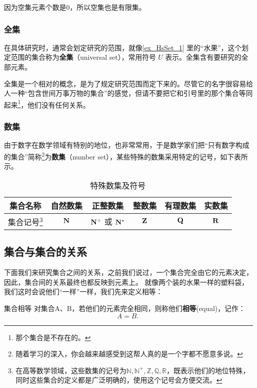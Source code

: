 因为空集元素个数是0，所以空集也是有限集。

\subsubsection{全集}

在具体研究时，通常会划定研究的范围，就像\autoref{ex_HsSet_1} 里的“水果”，这个划定范围的集合称为\textbf{全集}（universal set），常用符号 $U$ 表示。全集含有要研究的全部元素。

全集是一个相对的概念，是为了规定研究范围而定下来的。尽管它的名字很容易给人一种“包含世间万事万物的集合”的感觉，但请不要把它和引号里的那个集合等同起来\footnote{那个集合是不存在的。}，他们没有任何关系。

\subsubsection{数集}

由于数字在数学领域有特别的地位，也非常常用，于是数学家们把“只有数字构成的集合”简称\footnote{随着学习的深入，你会越来越感受到这帮人真的是一个字都不愿意多说。}为\textbf{数集}（number set），某些特殊的数集采用特定的记号，如下表所示。

\begin{table}[ht]
\centering
\caption{特殊数集及符号}\label{tab_HsSet2}
\begin{tabular}{|c|c|c|c|c|c|}
\hline
集合名称 &自然数集  &正整数集  & 整数集 & 有理数集& 实数集 \\
\hline
集合记号\footnote{在高等数学领域，这些数集的记号为$\mathbb{N,N^+,Z,Q,R}$，既表示他们的地位特殊，同时这些集合的定义都是广泛明确的，使用这个记号会方便交流。} & ${\rm \mathbf{N}}$ & ${\rm \mathbf{N^+}}$ 或 ${\rm \mathbf{N^*}}$ & ${\rm \mathbf{Z}}$ & ${\rm \mathbf{Q}}$ & ${\rm \mathbf{R}}$ \\
\hline
\end{tabular}
\end{table}


\subsection{集合与集合的关系}\label{sub_HsSet_1}
下面我们来研究集合之间的关系，之前我们说过，一个集合完全由它的元素决定，因此，集合间的关系最终也都反映到元素上。
就像两个装的水果一样的塑料袋，我们这时会说他们“一样”一样，我们先来定义相等：
\begin{definition}{集合相等}
对集合A、B，若他们的元素完全相同，则称他们\textbf{相等}(equal)，记作：
\begin{equation}
A=B.~
\end{equation}
\end{definition}

